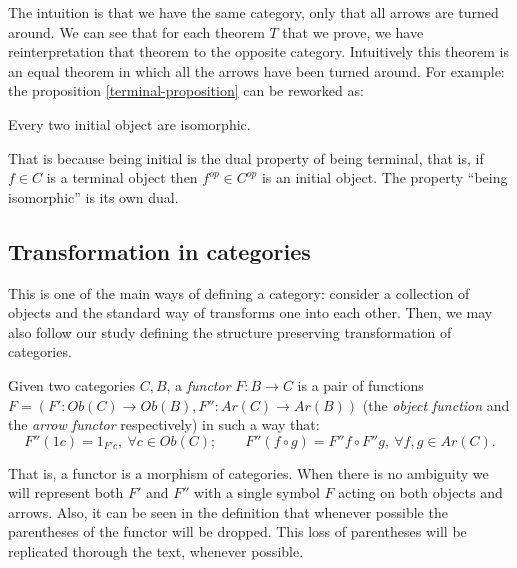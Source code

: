 The intuition is that we have the same category, only that all arrows are turned around. We can see that  for each theorem $T$ that we prove, we have reinterpretation that theorem to the opposite category. Intuitively this theorem is an equal theorem in which all the arrows have been turned around. For example: the proposition
\ref{terminal-proposition} can be reworked as:

\begin{proposition}
  Every two initial object are isomorphic.
\end{proposition}


That is because being initial is the dual property of being terminal, that is, if $f\in C$ is a terminal object then $f^{op}\in C^{op}$ is an initial object. The property ``being isomorphic'' is its own dual.

\subsection{Transformation in categories}




This is one of the main ways of defining a category: consider a collection of objects and the standard way of transforms one into each other. Then, we may also follow our study defining the structure preserving transformation of categories.

\begin{definition}
  Given two categories $C, B$, a \emph{functor} $F: B \to C$ is a pair of functions $F=(F':Ob(C)\to Ob(B),F'':Ar(C)\to Ar(B))$ (the \emph{object function} and the \emph{arrow functor} respectively) in such a way that:
  $$F''(1c) = 1_{F'c}, \ \forall c \in Ob(C); \qquad F''(f\circ g) = F''f \circ F''g, \ \forall f,g  \in Ar(C).$$

\end{definition}


That is,  a functor is a morphism of categories. When there is no ambiguity we will represent both $F'$ and $F''$ with a single symbol $F$ acting on both objects and arrows. Also, it can be seen in the definition that whenever possible the parentheses of the functor will be dropped. This loss of parentheses will be replicated thorough the text, whenever possible.\\



